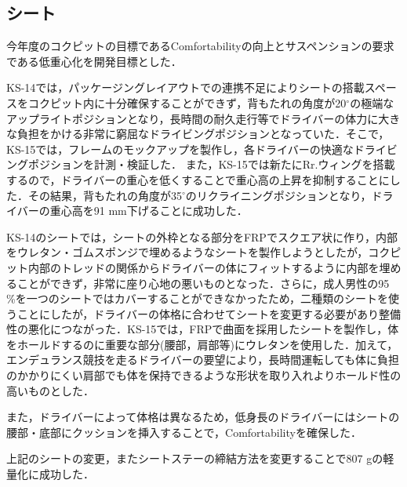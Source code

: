 \subsection{シート}
\label{sec:seat}
今年度のコクピットの目標であるComfortabilityの向上とサスペンションの要求である低重心化を開発目標とした．%

KS-14では，パッケージングレイアウトでの連携不足によりシートの搭載スペースをコクピット内に十分確保することができず，背もたれの角度が20$^\circ$の極端なアップライトポジションとなり，長時間の耐久走行等でドライバーの体力に大きな負担をかける非常に窮屈なドライビングポジションとなっていた．そこで，KS-15では，フレームのモックアップを製作し，各ドライバーの快適なドライビングポジションを計測・検証した．
また，KS-15では新たにRr.ウィングを搭載するので，ドライバーの重心を低くすることで重心高の上昇を抑制することにした．その結果，背もたれの角度が35$^\circ$のリクライニングポジションとなり，ドライバーの重心高を91 mm下げることに成功した．

KS-14のシートでは，シートの外枠となる部分をFRPでスクエア状に作り，内部をウレタン・ゴムスポンジで埋めるようなシートを製作しようとしたが，コクピット内部のトレッドの関係からドライバーの体にフィットするように内部を埋めることができず，非常に座り心地の悪いものとなった．さらに，成人男性の95 \%を一つのシートではカバーすることができなかったため，二種類のシートを使うことにしたが，ドライバーの体格に合わせてシートを変更する必要があり整備性の悪化につながった．KS-15では，FRPで曲面を採用したシートを製作し，体をホールドするのに重要な部分(腰部，肩部等)にウレタンを使用した．加えて，エンデュランス競技を走るドライバーの要望により，長時間運転しても体に負担のかかりにくい肩部でも体を保持できるような形状を取り入れよりホールド性の高いものとした．

また，ドライバーによって体格は異なるため，低身長のドライバーにはシートの腰部・底部にクッションを挿入することで，Comfortabilityを確保した．

上記のシートの変更，またシートステーの締結方法を変更することで807 gの軽量化に成功した．

